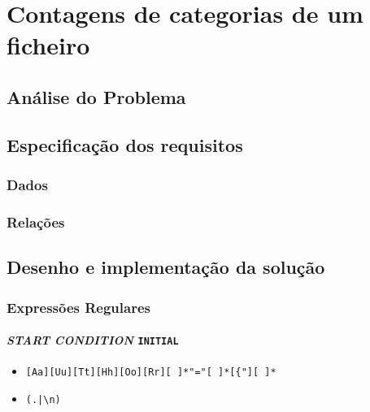 \chapter{Contagens de categorias de um ficheiro \BibTeX}
\label{chap:c}

\section{Análise do Problema}
\label{sec:cp:c}

\section{Especificação dos requisitos}
\label{sec:spec:c}

\subsection{Dados}

\subsection{Relações}


\section{Desenho e implementação da solução}
\label{sec:des:c}



\subsection{Expressões Regulares}


\subsubsection{\emph{START CONDITION} \texttt{INITIAL}}

\begin{itemize}
\item 
\begin{verbatim}
[Aa][Uu][Tt][Hh][Oo][Rr][ ]*"="[ ]*[{"][ ]*
\end{verbatim}

\item 
\begin{verbatim}
(.|\n)
\end{verbatim}

\end{itemize}


